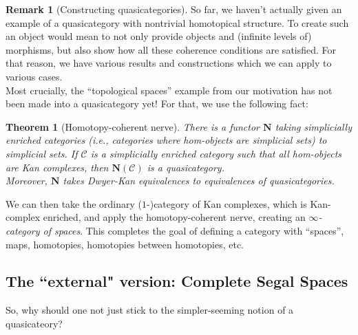 \documentclass{article}
\newcommand{\C}{\mathscr{C}}
\newtheorem{thm}[subsection]{Theorem}
\theoremstyle{definition}
\newtheorem{rem}[subsection]{Remark}
\begin{document}
\begin{rem}[Constructing quasicategories]
    So far, we haven't actually given an example of a quasicategory with nontrivial homotopical structure. To create such an object would mean to not only provide objects and (infinite levels of) morphisms, but also show how all these coherence conditions are satisfied. For that reason, we have various results and constructions which we can apply to various cases. \\ 
    Most crucially, the ``topological spaces'' example from our motivation has not been made into a quasicategory yet! For that, we use the following fact: 
    \begin{thm}[Homotopy-coherent nerve]
        There is a functor $\mathbf{N}$ taking simplicially enriched categories (i.e., categories where hom-objects are simplicial sets) to simplicial sets. If $\C$ is a simplicially enriched category such that all hom-objects are Kan complexes, then $\mathbf{N}(\C)$ is a quasicategory. 
        \\ 
        Moreover, $\mathbf{N}$ takes Dwyer-Kan equivalences to equivalences of quasicategories.
    \end{thm}
    We can then take the ordinary ($1$-)category of Kan complexes, which is Kan-complex enriched, and apply the homotopy-coherent nerve, creating an \textit{$\infty$-category of spaces}. This completes the goal of defining a category with ``spaces'', maps, homotopies, homotopies between homotopies, etc.
\end{rem}

\subsection*{The ``external" version: Complete Segal Spaces}

So, why should one not just stick to the simpler-seeming notion of a quasicateory?
\end{document}
